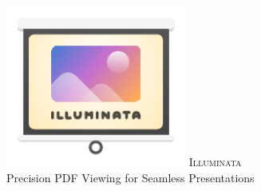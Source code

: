 \documentclass[43]{beamer}
\begin{document}
\rmfamily
\begin{frame}\centering\thispagestyle{empty}
  \includegraphics[width=16em]{logo.pdf}
  {\fontsize{50}{60}\selectfont\scshape\color{GoogleGreen} Illuminata}\\[1em]
  {\Large Precision PDF Viewing for Seamless Presentations}
\end{frame}
\end{document}
